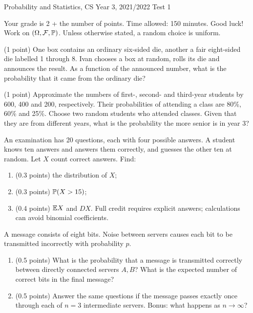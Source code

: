 \documentclass[a4paper]{report}
\begin{document}
\noindent Probability and Statistics, CS Year 3, 2021/2022 \hfill Test 1
\hrulefill
\begin{it}Your grade is 2 + the number of points. Time allowed: 150 minutes. Good luck! Work on $(\Omega,\mathcal F,\P)$. Unless otherwise stated, a random choice is uniform.\end{it}
\begin{problem} (1 point)
One box contains an ordinary six-sided die, another a fair eight-sided die labelled 1 through 8. Ivan chooses a box at random, rolls its die and announces the result. As a function of the announced number, what is the probability that it came from the ordinary die?
\end{problem}
\begin{problem} (1 point)
Approximate the numbers of first-, second- and third-year students by 600, 400 and 200, respectively. Their probabilities of attending a class are 80\%, 60\% and 25\%. Choose two random students who attended classes. Given that they are from different years, what is the probability the more senior is in year 3?
\end{problem}
\begin{problem}
An examination has 20 questions, each with four possible answers. A student knows ten answers and answers them correctly, and guesses the other ten at random. Let $X$ count correct answers. Find:
\begin{enumerate}
\item (0.3 points) the distribution of $X$;
\item (0.3 points) $\P(X>15)$;
\item (0.4 points) $\E X$ and $DX$. Full credit requires explicit answers; calculations can avoid binomial coefficients.
\end{enumerate}
\end{problem}
\begin{problem}
A message consists of eight bits. Noise between servers causes each bit to be transmitted incorrectly with probability $p$.
\begin{center}\end{center}
\begin{enumerate}
\item (0.5 points) What is the probability that a message is transmitted correctly between directly connected servers $A,B$? What is the expected number of correct bits in the final message?
\item (0.5 points) Answer the same questions if the message passes exactly once through each of $n=3$ intermediate servers. Bonus: what happens as $n\to\infty$?
\end{enumerate}
\end{problem}
\end{document}
